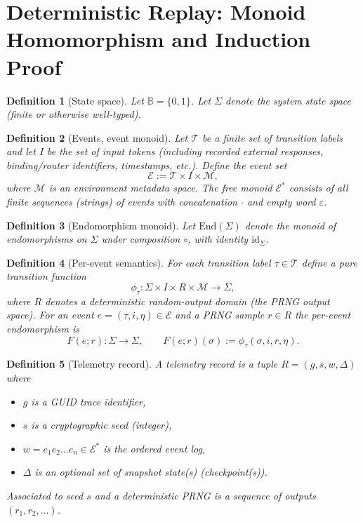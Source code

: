 \documentclass[11pt]{article}
\newtheorem{definition}{Definition}[section]
\begin{document}
\section*{Deterministic Replay: Monoid Homomorphism and Induction Proof}

\begin{definition}[State space]
Let $\mathbb{B}=\{0,1\}$. Let $\Sigma$ denote the system state space (finite or otherwise well-typed).
\end{definition}

\begin{definition}[Events, event monoid]
Let $\mathcal{T}$ be a finite set of \emph{transition labels} and let $I$ be the set of \emph{input tokens} (including recorded external responses, binding/router identifiers, timestamps, etc.). Define the event set
\[
\mathcal{E} := \mathcal{T}\times I \times \mathcal{M},
\]
where $\mathcal{M}$ is an environment metadata space. The free monoid $\mathcal{E}^*$ consists of all finite sequences (strings) of events with concatenation $\cdot$ and empty word $\varepsilon$.
\end{definition}

\begin{definition}[Endomorphism monoid]
Let $\mathrm{End}(\Sigma)$ denote the monoid of endomorphisms on $\Sigma$ under composition $\circ$, with identity $\mathrm{id}_\Sigma$.
\end{definition}

\begin{definition}[Per-event semantics]
For each transition label $\tau\in\mathcal{T}$ define a \emph{pure} transition function
\[
\phi_\tau : \Sigma \times I \times R \times \mathcal{M} \to \Sigma,
\]
where $R$ denotes a deterministic random-output domain (the PRNG output space). For an event $e=(\tau,i,\eta)\in\mathcal{E}$ and a PRNG sample $r\in R$ the per-event endomorphism is
\[
F(e;r) : \Sigma \to \Sigma,\qquad F(e;r)(\sigma) := \phi_\tau(\sigma,i,r,\eta).
\]
\end{definition}

\begin{definition}[Telemetry record]
A telemetry record is a tuple $R=(g, s, w, \Delta)$ where
\begin{itemize}
  \item $g$ is a GUID trace identifier,
  \item $s$ is a cryptographic seed (integer),
  \item $w = e_1 e_2 \dots e_n \in \mathcal{E}^*$ is the ordered event log,
  \item $\Delta$ is an optional set of snapshot state(s) (checkpoint(s)).
\end{itemize}
Associated to seed $s$ and a deterministic PRNG is a sequence of outputs $(r_1,r_2,\dots)$.
\end{definition}
\end{document}

